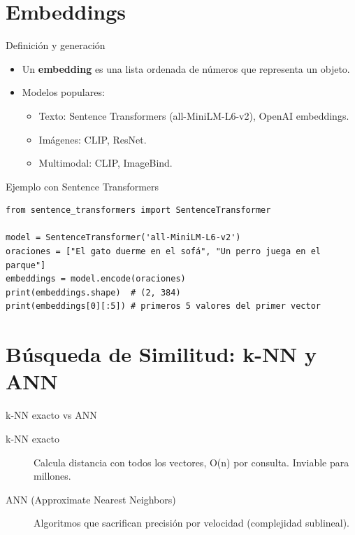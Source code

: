 \documentclass[aspectratio=169, 10pt, xcolor=table]{beamer}
\begin{document}
\section{Embeddings}

\begin{frame}{Definición y generación}
    \begin{itemize}
        \item Un \textbf{embedding} es una lista ordenada de números que representa un objeto.
        \item Modelos populares:
        \begin{itemize}
            \item Texto: Sentence Transformers (all-MiniLM-L6-v2), OpenAI embeddings.
            \item Imágenes: CLIP, ResNet.
            \item Multimodal: CLIP, ImageBind.
        \end{itemize}
    \end{itemize}
\end{frame}

\begin{frame}[fragile]{Ejemplo con Sentence Transformers}
    \begin{lstlisting}[style=python]
from sentence_transformers import SentenceTransformer

model = SentenceTransformer('all-MiniLM-L6-v2')
oraciones = ["El gato duerme en el sofá", "Un perro juega en el parque"]
embeddings = model.encode(oraciones)
print(embeddings.shape)  # (2, 384)
print(embeddings[0][:5]) # primeros 5 valores del primer vector
    \end{lstlisting}
\end{frame}

\section{Búsqueda de Similitud: k-NN y ANN}

\begin{frame}{k-NN exacto vs ANN}
    \begin{description}
        \item[k-NN exacto] Calcula distancia con todos los vectores, O(n) por consulta. Inviable para millones.
        \item[ANN (Approximate Nearest Neighbors)] Algoritmos que sacrifican precisión por velocidad (complejidad sublineal).
    \end{description}
\end{frame}
\end{document}
